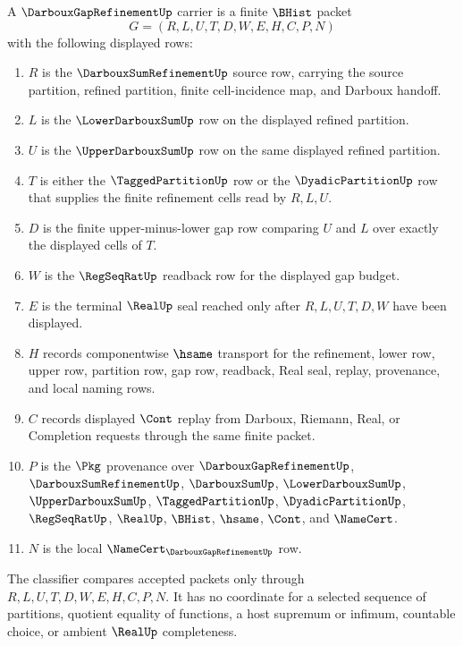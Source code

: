 \begin{definition}
\label{def:darboux-gap-refinement-carrier}
A $\DarbouxGapRefinementUp$ carrier is a finite $\BHist$ packet
$$
G=(R,L,U,T,D,W,E,H,C,P,N)
$$
with the following displayed rows:
\begin{enumerate}
\item $R$ is the $\DarbouxSumRefinementUp$ source row, carrying the source partition, refined partition, finite cell-incidence map, and Darboux handoff.
\item $L$ is the $\LowerDarbouxSumUp$ row on the displayed refined partition.
\item $U$ is the $\UpperDarbouxSumUp$ row on the same displayed refined partition.
\item $T$ is either the $\TaggedPartitionUp$ row or the $\DyadicPartitionUp$ row that supplies the finite refinement cells read by $R,L,U$.
\item $D$ is the finite upper-minus-lower gap row comparing $U$ and $L$ over exactly the displayed cells of $T$.
\item $W$ is the $\RegSeqRatUp$ readback row for the displayed gap budget.
\item $E$ is the terminal $\RealUp$ seal reached only after $R,L,U,T,D,W$ have been displayed.
\item $H$ records componentwise $\hsame$ transport for the refinement, lower row, upper row, partition row, gap row, readback, Real seal, replay, provenance, and local naming rows.
\item $C$ records displayed $\Cont$ replay from Darboux, Riemann, Real, or Completion requests through the same finite packet.
\item $P$ is the $\Pkg$ provenance over $\DarbouxGapRefinementUp$, $\DarbouxSumRefinementUp$, $\DarbouxSumUp$, $\LowerDarbouxSumUp$, $\UpperDarbouxSumUp$, $\TaggedPartitionUp$, $\DyadicPartitionUp$, $\RegSeqRatUp$, $\RealUp$, $\BHist$, $\hsame$, $\Cont$, and $\NameCert$.
\item $N$ is the local $\NameCert_{\DarbouxGapRefinementUp}$ row.
\end{enumerate}
The classifier compares accepted packets only through $R,L,U,T,D,W,E,H,C,P,N$. It has no coordinate for a selected sequence of partitions, quotient equality of functions, a host supremum or infimum, countable choice, or ambient $\RealUp$ completeness.
\end{definition}

